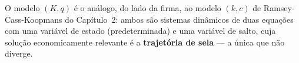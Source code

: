\documentclass[11pt,a4paper]{article}
\begin{document}
\noindent O modelo $(K,q)$ é o análogo, do lado da firma, ao modelo
$(k,c)$ de Ramsey-Cass-Koopmans do Capítulo~2: ambos são sistemas
dinâmicos de duas equações com uma variável de estado (predeterminada)
e uma variável de salto, cuja solução economicamente relevante é a
\textbf{trajetória de sela} --- a única que não diverge.
\end{document}
